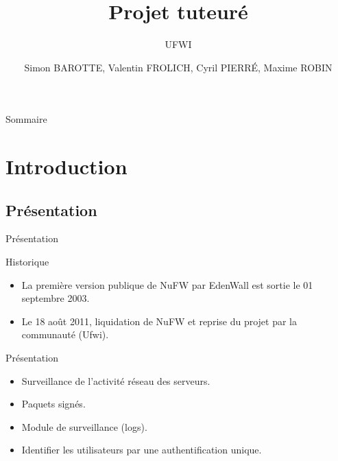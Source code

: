\documentclass[t,12pt]{beamer}
\title{Projet tuteuré}
\subtitle{UFWI}
\author{Simon BAROTTE, Valentin FROLICH, Cyril PIERRÉ, Maxime ROBIN}
\begin{document}
\frame{\titlepage}


\begin{frame}{Sommaire}
	\tableofcontents[]       %
\end{frame} 

\section{Introduction}  
  \subsection{Présentation}                                            
    \begin{frame}{Présentation}                                              
	    \begin{block}{Historique}
        \begin{itemize}  
	        \item La première version publique de NuFW par EdenWall est sortie le 01 septembre 2003.
	        \item Le 18 août 2011, liquidation de NuFW et reprise du projet par la communauté (Ufwi).
        \end{itemize} 
      \end{block}
      \pause
      \begin{block}{Présentation}
        \begin{itemize}  
	        \item Surveillance de l'activité réseau des serveurs.
	        \item Paquets signés.
	        \item Module de surveillance (logs).
          \item Identifier les utilisateurs par une authentification unique.
        \end{itemize} 
      \end{block}
    \end{frame} 
\end{document}
